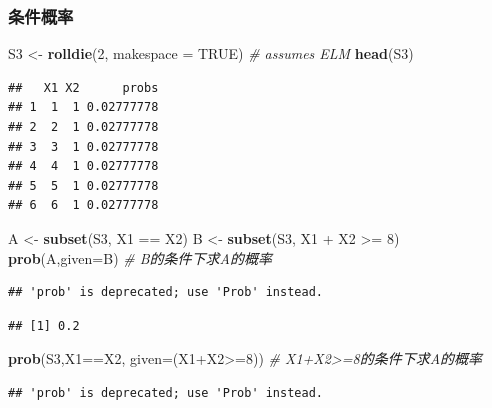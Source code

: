 \documentclass[]{article}
\newenvironment{Shaded}{\begin{snugshade}}{\end{snugshade}}
\newcommand{\KeywordTok}[1]{\textcolor[rgb]{0.13,0.29,0.53}{\textbf{{#1}}}}
\newcommand{\DataTypeTok}[1]{\textcolor[rgb]{0.13,0.29,0.53}{{#1}}}
\newcommand{\DecValTok}[1]{\textcolor[rgb]{0.00,0.00,0.81}{{#1}}}
\newcommand{\StringTok}[1]{\textcolor[rgb]{0.31,0.60,0.02}{{#1}}}
\newcommand{\CommentTok}[1]{\textcolor[rgb]{0.56,0.35,0.01}{\textit{{#1}}}}
\newcommand{\OtherTok}[1]{\textcolor[rgb]{0.56,0.35,0.01}{{#1}}}
\newcommand{\NormalTok}[1]{{#1}}
\begin{document}
\subsubsection{条件概率}

\begin{Shaded}
\begin{Highlighting}[]
\NormalTok{S3 <-}\StringTok{ }\KeywordTok{rolldie}\NormalTok{(}\DecValTok{2}\NormalTok{, }\DataTypeTok{makespace =} \OtherTok{TRUE}\NormalTok{) }\CommentTok{# assumes ELM}
\KeywordTok{head}\NormalTok{(S3)}
\end{Highlighting}
\end{Shaded}

\begin{verbatim}
##   X1 X2      probs
## 1  1  1 0.02777778
## 2  2  1 0.02777778
## 3  3  1 0.02777778
## 4  4  1 0.02777778
## 5  5  1 0.02777778
## 6  6  1 0.02777778
\end{verbatim}

\begin{Shaded}
\begin{Highlighting}[]
\NormalTok{A <-}\StringTok{ }\KeywordTok{subset}\NormalTok{(S3, X1 ==}\StringTok{ }\NormalTok{X2)}
\NormalTok{B <-}\StringTok{ }\KeywordTok{subset}\NormalTok{(S3, X1 +}\StringTok{ }\NormalTok{X2 >=}\StringTok{ }\DecValTok{8}\NormalTok{)}
\KeywordTok{prob}\NormalTok{(A,}\DataTypeTok{given=}\NormalTok{B) }\CommentTok{# B的条件下求A的概率}
\end{Highlighting}
\end{Shaded}

\begin{verbatim}
## 'prob' is deprecated; use 'Prob' instead.
\end{verbatim}

\begin{verbatim}
## [1] 0.2
\end{verbatim}

\begin{Shaded}
\begin{Highlighting}[]
\KeywordTok{prob}\NormalTok{(S3,X1==X2, }\DataTypeTok{given=}\NormalTok{(X1+X2>=}\DecValTok{8}\NormalTok{)) }\CommentTok{# X1+X2>=8的条件下求A的概率}
\end{Highlighting}
\end{Shaded}

\begin{verbatim}
## 'prob' is deprecated; use 'Prob' instead.
\end{verbatim}
\end{document}
